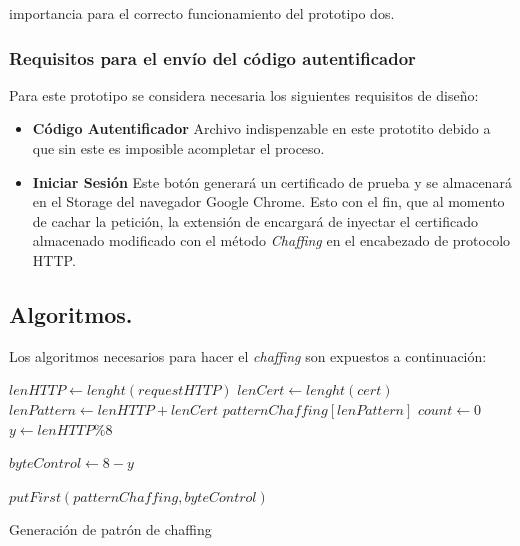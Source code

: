 \documentclass[12pt, a4paper, titlepage]{report}
\begin{document}
 importancia para el correcto funcionamiento del prototipo dos.
    			     \subsubsection{Requisitos para el envío del código autentificador}   
    			        Para este prototipo se considera necesaria los siguientes requisitos de diseño:
    			        \begin{itemize}
    			            \item \textbf{Código Autentificador} Archivo indispenzable en este prototito debido a que sin este es imposible acompletar el proceso.
                            
    			            \item \textbf{Iniciar Sesión} Este botón generará un certificado de prueba y se almacenará en el Storage del navegador Google Chrome. Esto con el fin, que al momento de cachar la petición, la extensión de encargará de inyectar el certificado almacenado modificado con el método \textit{Chaffing} en el encabezado de protocolo HTTP.
    			           
    			        \end{itemize}
    			        \newpage
    			        
    			        
    		\subsection{Algoritmos.}
		        Los algoritmos necesarios para hacer el \textit{chaffing} son expuestos a continuación:\\
                \begin{algorithm}[H]
                    \SetAlgoLined
                    
                    $lenHTTP \longleftarrow lenght(requestHTTP)$\;
                    $lenCert \longleftarrow lenght(cert)$\;
                    $lenPattern \longleftarrow lenHTTP + lenCert$\;
                    $patternChaffing[lenPattern]$\;
                    $count \longleftarrow 0$\;
                    $y \longleftarrow lenHTTP \% 8$\;
                    
                    $byteControl \longleftarrow 8-y$\;
                    
                    $putFirst(patternChaffing, byteControl)$\;
                    
                    \caption{Generación de patrón de chaffing}
                \end{algorithm}
                
\end{document}
